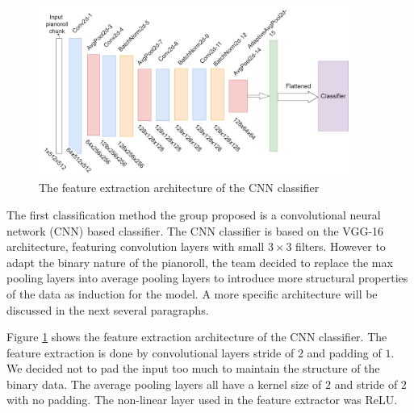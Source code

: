 \begin{par}

    \begin{figure}[H]
        \centering
        \includegraphics[width=4in]{image/cnn_classifier_feature_architecture}
        \caption{The feature extraction architecture of the CNN classifier}
        \label{fig:cnn_feature}
    \end{figure}

    \par \hspace{15pt} The first classification method the group proposed is a convolutional neural network (CNN) based classifier. The CNN classifier is based on the VGG-16 architecture, featuring convolution layers with small $3 \times 3$ filters. However to adapt the binary nature of the pianoroll, the team decided to replace the max pooling layers into average pooling layers to introduce more structural properties of the data as induction for the model. A more specific architecture will be discussed in the next several paragraphs.

    \par \hspace{15pt} Figure \ref{fig:cnn_feature} shows the feature extraction architecture of the CNN classifier. The feature extraction is done by convolutional layers stride of 2 and padding of $1$. We decided not to pad the input too much to maintain the structure of the binary data. The average pooling layers all have a kernel size of $2$ and stride of $2$ with no padding. The non-linear layer used in the feature extractor was ReLU. 
    

\end{par}
